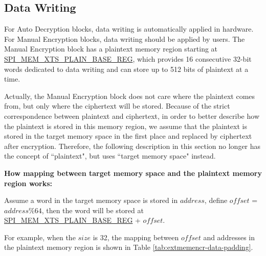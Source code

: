 \documentclass[main\_\_EN.tex]{subfiles}
\begin{document}
\subsection{Data Writing} 
\label{sec:extmemncr-data-writing}

For Auto Decryption blocks, data writing is automatically applied in hardware. For Manual Encryption blocks, data writing should be applied by users. The Manual Encryption block has a plaintext memory region starting at \hyperref[regdesc:SPIMEMXTSPLAINBASEREG]{SPI\_MEM\_XTS\_PLAIN\_BASE\_REG}, which provides 16 consecutive 32-bit words dedicated to data writing and can store up to 512 bits of plaintext at a time.

Actually, the Manual Encryption block does not care where the plaintext comes from, but only where the ciphertext will be stored. Because of the strict correspondence between plaintext and ciphertext, in order to better describe how the plaintext is stored in this memory region, we assume that the plaintext is stored in the target memory space in the first place and replaced by ciphertext after encryption. Therefore, the following description in this section no longer has the concept of ``plaintext", but uses ``target memory space" instead.

{\bfseries How mapping between target memory space and the plaintext memory region works:}

Assume a word in the target memory space is stored in \begin{math} address \end{math}, define \begin{math}offset\end{math} = \begin{math} address \% 64 \end{math}, then the word will be stored at \hyperref[regdesc:SPIMEMXTSPLAINBASEREG]{SPI\_MEM\_XTS\_PLAIN\_BASE\_REG} + \begin{math}offset\end{math}.

For example, when the \begin{math} size \end{math} is 32, the mapping between \begin{math}offset\end{math} and addresses in the plaintext memory region is shown in Table \ref{tab:extmemencr-data-padding}.


\end{document}
